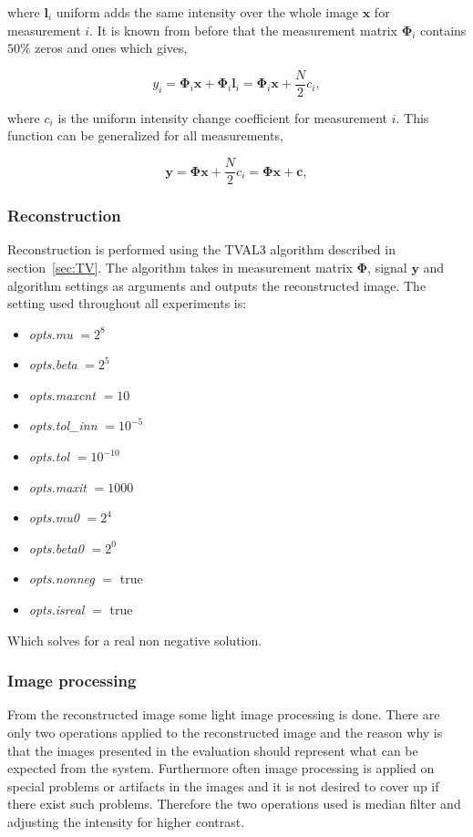where $\mathbf{l}_i$ uniform adds the same intensity over the whole image $\mathbf{x}$ for measurement $i$. It is known from before that the measurement matrix $\mathbf{\Phi}_i$ contains $50\%$ zeros and ones which gives,

\begin{equation}
y_i = \mathbf{\Phi}_i\mathbf{x} + \mathbf{\Phi}_i\mathbf{l}_i = \mathbf{\Phi}_i\mathbf{x} + \frac{N}{2}c_i,
\end{equation}

where $c_i$ is the uniform intensity change coefficient for measurement $i$. This function can be generalized for all measurements,

\begin{equation}
\mathbf{y} = \mathbf{\Phi}\mathbf{x} + \frac{N}{2}c_i = \mathbf{\Phi}\mathbf{x} + \mathbf{c},
\end{equation} 

\subsubsection{Reconstruction}
Reconstruction is performed using the TVAL3 algorithm described in section~\ref{sec:TV}. The algorithm takes in measurement matrix $\mathbf{\Phi}$, signal $\mathbf{y}$ and algorithm settings as arguments and outputs the reconstructed image. The setting used throughout all experiments is:

\begin{itemize}
\item \textit{opts.mu} $= 2^8$
\item \textit{opts.beta} $= 2^5$
\item \textit{opts.maxcnt} $= 10$
\item \textit{opts.tol\_inn} $= 10^{-5}$
\item \textit{opts.tol} $= 10^{-10}$ 
\item \textit{opts.maxit} $= 1000$
\item \textit{opts.mu0} $= 2^4$ 
\item \textit{opts.beta0} $= 2^0$
\item \textit{opts.nonneg} $=$ true 
\item \textit{opts.isreal} $=$ true	
\end{itemize} 

Which solves for a real non negative solution. 


\subsubsection{Image processing}
From the reconstructed image some light image processing is done. There are only two operations applied to the reconstructed image and the reason why is that the images presented in the evaluation should represent what can be expected from the system. Furthermore often image processing is applied on special problems or artifacts in the images and it is not desired to cover up if there exist such problems. Therefore the two operations used is median filter and adjusting the intensity for higher contrast.\\[0.1in]

